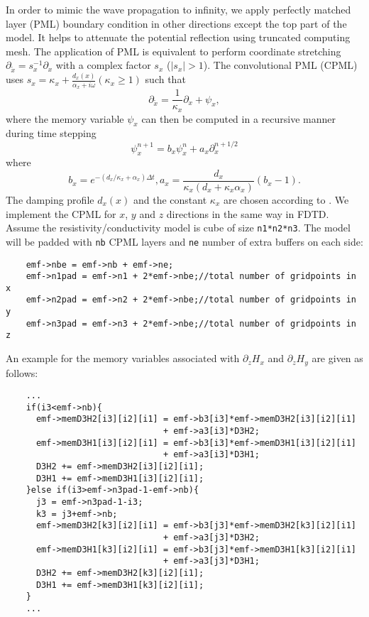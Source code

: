 \documentclass[a4paper,10pt]{article}
\begin{document}
In order to mimic the wave propagation to infinity, we apply perfectly matched layer (PML) \citep{Chew_1994_PMM} boundary condition in other directions except the top part of the model. It helps to attenuate the potential reflection using truncated computing mesh. The application of PML is equivalent to perform  coordinate stretching $\partial_{\tilde{x}}=s_x^{-1}\partial_x$ with a complex factor $s_x$ ($|s_x|>1$). The convolutional PML (CPML) \citep{Roden_2000_CPML} uses $s_x = \kappa_x + \frac{d_x(x)}{\alpha_x + i\omega} (\kappa_x\ge 1)$ such that
\begin{equation}
  \partial_{\tilde{x}} = \frac{1}{\kappa_x}\partial_x +\psi_x,
\end{equation}
where the memory variable $\psi_x$ can then be computed in a recursive manner during time stepping
\begin{equation}
    \psi_x^{n+1}= b_x \psi_x^n + a_x \partial_x^{n+1/2}
\end{equation}
where
\begin{equation}
  b_x = e^{-(d_x/\kappa_x+\alpha_x)\Delta t}, a_x = \frac{d_x}{\kappa_x(d_x+\kappa_x \alpha_x)} (b_x-1). 
\end{equation}
The damping profile $d_x(x)$  and the constant $\kappa_x$ are chosen according to \citep{Komatitsch_2007_GEO}.
We implement the CPML for $x$, $y$ and $z$ directions in the same way in FDTD. Assume the resistivity/conductivity model is cube of size \verb|n1*n2*n3|. The model will be padded with \verb|nb| CPML layers and \verb|ne| number of  extra buffers on each side:\\
\begin{verbatim}
    emf->nbe = emf->nb + emf->ne;
    emf->n1pad = emf->n1 + 2*emf->nbe;//total number of gridpoints in x
    emf->n2pad = emf->n2 + 2*emf->nbe;//total number of gridpoints in y
    emf->n3pad = emf->n3 + 2*emf->nbe;//total number of gridpoints in z
\end{verbatim}
An example for the memory variables associated with $\partial_z H_x$ and $\partial_z H_y$ are given as follows:
\begin{verbatim}
    ...
    if(i3<emf->nb){
      emf->memD3H2[i3][i2][i1] = emf->b3[i3]*emf->memD3H2[i3][i2][i1] 
                               + emf->a3[i3]*D3H2;
      emf->memD3H1[i3][i2][i1] = emf->b3[i3]*emf->memD3H1[i3][i2][i1]
                               + emf->a3[i3]*D3H1;
      D3H2 += emf->memD3H2[i3][i2][i1];
      D3H1 += emf->memD3H1[i3][i2][i1];
    }else if(i3>emf->n3pad-1-emf->nb){
      j3 = emf->n3pad-1-i3;
      k3 = j3+emf->nb;
      emf->memD3H2[k3][i2][i1] = emf->b3[j3]*emf->memD3H2[k3][i2][i1] 
                               + emf->a3[j3]*D3H2;
      emf->memD3H1[k3][i2][i1] = emf->b3[j3]*emf->memD3H1[k3][i2][i1] 
                               + emf->a3[j3]*D3H1;
      D3H2 += emf->memD3H2[k3][i2][i1];
      D3H1 += emf->memD3H1[k3][i2][i1];
    }
    ...
\end{verbatim}
\end{document}
